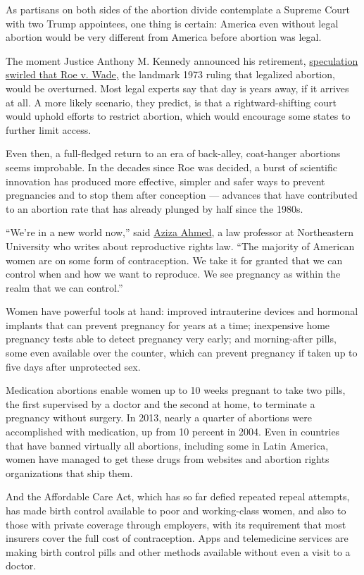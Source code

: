 As partisans on both sides of the abortion divide contemplate a Supreme
Court with two Trump appointees, one thing is certain: America even
without legal abortion would be very different from America before
abortion was legal.

The moment Justice Anthony M. Kennedy announced his retirement,
\href{https://www.nytimes3xbfgragh.onion/2018/06/27/us/politics/kennedy-abortion-roe-v-wade.html}{speculation
swirled that Roe v. Wade,} the landmark 1973 ruling that legalized
abortion, would be overturned. Most legal experts say that day is years
away, if it arrives at all. A more likely scenario, they predict, is
that a rightward-shifting court would uphold efforts to restrict
abortion, which would encourage some states to further limit access.

Even then, a full-fledged return to an era of back-alley, coat-hanger
abortions seems improbable. In the decades since Roe was decided, a
burst of scientific innovation has produced more effective, simpler and
safer ways to prevent pregnancies and to stop them after conception ---
advances that have contributed to an abortion rate that has already
plunged by half since the 1980s.

``We're in a new world now,'' said
\href{https://www.northeastern.edu/law/faculty/directory/ahmed.html}{Aziza
Ahmed}, a law professor at Northeastern University who writes about
reproductive rights law. ``The majority of American women are on some
form of contraception. We take it for granted that we can control when
and how we want to reproduce. We see pregnancy as within the realm that
we can control.''

Women have powerful tools at hand: improved intrauterine devices and
hormonal implants that can prevent pregnancy for years at a time;
inexpensive home pregnancy tests able to detect pregnancy very early;
and morning-after pills, some even available over the counter, which can
prevent pregnancy if taken up to five days after unprotected sex.

Medication abortions enable women up to 10 weeks pregnant to take two
pills, the first supervised by a doctor and the second at home, to
terminate a pregnancy without surgery. In 2013, nearly a quarter of
abortions were accomplished with medication, up from 10 percent in 2004.
Even in countries that have banned virtually all abortions, including
some in Latin America, women have managed to get these drugs from
websites and abortion rights organizations that ship them.

And the Affordable Care Act, which has so far defied repeated repeal
attempts, has made birth control available to poor and working-class
women, and also to those with private coverage through employers, with
its requirement that most insurers cover the full cost of contraception.
Apps and telemedicine services are making birth control pills and other
methods available without even a visit to a doctor.

